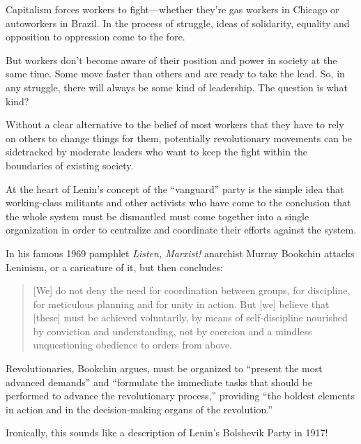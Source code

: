 Capitalism forces workers to fight---whether they're gas workers in Chicago or autoworkers in Brazil. In the process of struggle, ideas of solidarity, equality and opposition to oppression come to the fore.

But workers don't become aware of their position and power in society at the same time. Some move faster than others and are ready to take the lead. So, in any struggle, there will always be some kind of leadership. The question is what kind?

Without a clear alternative to the belief of most workers that they have to rely on others to change things for them, potentially revolutionary movements can be sidetracked by moderate leaders who want to keep the fight within the boundaries of existing society.

At the heart of Lenin's concept of the ``vanguard'' party is the simple idea that working-class militants and other activists who have come to the conclusion that the whole system must be dismantled must come together into a single organization in order to centralize and coordinate their efforts against the system.

In his famous 1969 pamphlet \emph{Listen, Marxist!} anarchist Murray Bookchin attacks Leninism, or a caricature of it, but then concludes:

\blockquote{[We] do not deny the need for coordination between groups, for discipline, for meticulous planning and for unity in action. But [we] believe that [these] must be achieved voluntarily, by means of self-discipline nourished by conviction and understanding, not by coercion and a mindless unquestioning obedience to orders from above.}

Revolutionaries, Bookchin argues, must be organized to ``present the most advanced demands'' and ``formulate the immediate tasks that should be performed to advance the revolutionary process,'' providing ``the boldest elements in action and in the decision-making organs of the revolution.''

Ironically, this sounds like a description of Lenin's Bolshevik Party in 1917!
